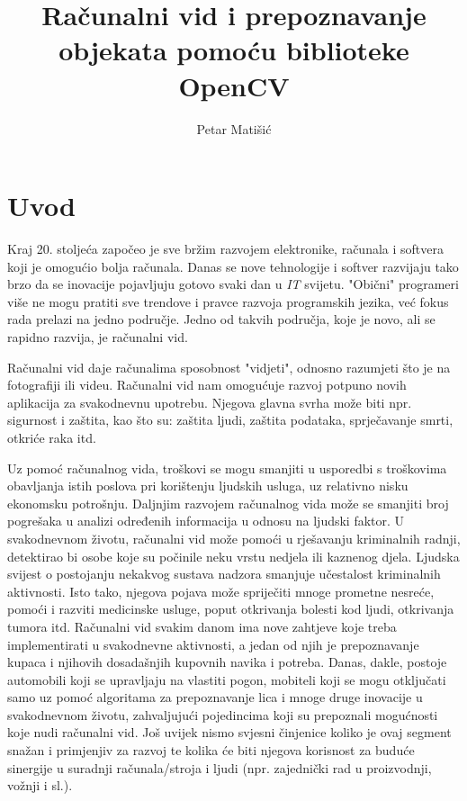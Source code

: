 \documentclass[]{foi} %
\title{Računalni vid i prepoznavanje objekata pomoću biblioteke OpenCV}
\author{Petar Matišić} %
\begin{document}
\maketitle

\tableofcontents

\makeatletter {} \makeatother
\pagestyle{plain}



\chapter{Uvod}

Kraj 20. stoljeća započeo je sve bržim razvojem elektronike, računala i softvera koji je omogućio bolja računala. Danas se nove tehnologije i softver razvijaju tako brzo da se inovacije pojavljuju gotovo svaki dan u \textit{IT} svijetu. "Obični" programeri više ne mogu pratiti sve trendove i pravce razvoja programskih jezika, već fokus rada prelazi na jedno područje. Jedno od takvih područja, koje je novo, ali se rapidno razvija, je računalni vid.

Računalni vid daje računalima sposobnost "vidjeti", odnosno razumjeti što je na fotografiji ili videu. Računalni vid nam omogućuje razvoj potpuno novih aplikacija za svakodnevnu upotrebu. Njegova glavna svrha može biti npr. sigurnost i zaštita, kao što su: zaštita ljudi, zaštita podataka, sprječavanje smrti, otkriće raka itd.

Uz pomoć računalnog vida, troškovi se mogu smanjiti u usporedbi s troškovima obavljanja istih poslova pri korištenju ljudskih usluga, uz relativno nisku ekonomsku potrošnju. Daljnjim razvojem računalnog vida može se smanjiti broj pogrešaka u analizi određenih informacija u odnosu na ljudski faktor. U svakodnevnom životu, računalni vid može pomoći u rješavanju kriminalnih radnji, detektirao bi osobe koje su počinile neku vrstu nedjela ili kaznenog djela. Ljudska svijest o postojanju nekakvog sustava nadzora smanjuje učestalost kriminalnih aktivnosti. Isto tako, njegova pojava može spriječiti mnoge prometne nesreće, pomoći i razviti medicinske usluge, poput otkrivanja bolesti kod ljudi, otkrivanja tumora itd. Računalni vid svakim danom ima nove zahtjeve koje treba implementirati u svakodnevne aktivnosti, a jedan od njih je prepoznavanje kupaca i njihovih dosadašnjih kupovnih navika i potreba. Danas, dakle, postoje  automobili koji se upravljaju na vlastiti pogon, mobiteli koji se mogu otključati samo uz pomoć algoritama za prepoznavanje lica i mnoge druge inovacije u svakodnevnom životu, zahvaljujući pojedincima koji su prepoznali mogućnosti koje nudi računalni vid. Još uvijek nismo svjesni činjenice koliko je ovaj segment snažan i primjenjiv za razvoj te kolika će biti njegova korisnost za buduće sinergije u suradnji računala/stroja i ljudi (npr. zajednički rad u proizvodnji, vožnji i sl.).
\end{document}
